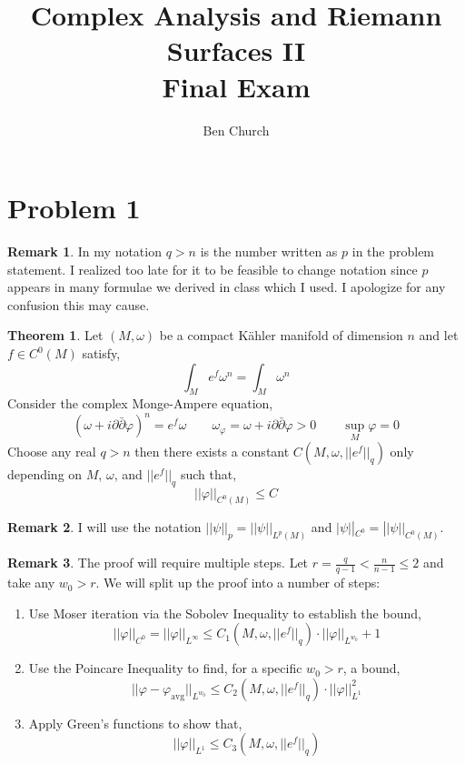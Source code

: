 \documentclass[12pt]{extarticle}
\theoremstyle{definition}
\newtheorem{theorem}{Theorem}[section]
\newtheorem{remark}{Remark}
\begin{document}
\title{Complex Analysis and Riemann Surfaces II \\ Final Exam}
\author{Ben Church}
\maketitle


\section{Problem 1}

\begin{remark}
In my notation $q > n$ is the number written as $p$ in the problem statement. I realized too late for it to be feasible to change notation since $p$ appears in many formulae we derived in class which I used. I apologize for any confusion this may cause.
\end{remark}

\begin{theorem}
Let $(M, \omega)$ be a compact K\"{a}hler manifold of dimension $n$ and let $f \in C^0(M)$ satisfy,
\[ \int_M e^f \omega^n = \int_M \omega^n \]
Consider the complex Monge-Ampere equation,
\[ (\omega + i \partial \bar{\partial} \varphi)^n = e^f \omega \quad \quad \omega_\varphi = \omega + i \partial \bar{\partial} \varphi > 0 \quad \quad \sup_M \varphi = 0 \]
Choose any real $q > n$ then there exists a constant $C(M, \omega, || e^f||_q)$ only depending on $M$, $\omega$, and $||e^f||_q$ such that,
\[ ||\varphi ||_{C^0(M)} \le C \]
\end{theorem}

\begin{remark}
I will use the notation $|| \psi ||_{p} = || \psi ||_{L^p(M)}$ and $| \psi ||_{C^0} = || \psi ||_{C^0(M)}$. 
\end{remark}

\begin{remark}
The proof will require multiple steps. Let $r = \frac{q}{q - 1} < \frac{n}{n - 1} \le 2$ and take any $w_0 > r$. We will split up the proof into a number of steps:
\begin{enumerate}
\item Use Moser iteration via the Sobolev Inequality to establish the bound,
\[ || \varphi ||_{C^0} = || \varphi ||_{L^\infty} \le C_1(M, \omega, || e^f ||_{q}) \cdot || \varphi  ||_{L^{w_0}} + 1 \]

\item Use the Poincare Inequality to find, for a specific $w_0 > r$, a bound,
\[ || \varphi - \varphi_{\text{avg}} ||_{L^{w_0}} \le C_2(M, \omega, || e^f ||_{q}) \cdot  || \varphi ||_{L^1}^2 \]

\item Apply Green's functions to show that,
\[ || \varphi ||_{L^1} \le C_3(M, \omega, || e^f ||_{q}) \]
\end{enumerate} 
\end{remark}
\end{document}
